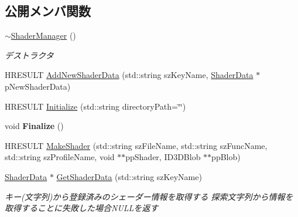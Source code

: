 \subsection*{公開メンバ関数}
\begin{DoxyCompactItemize}
\item 
\hyperlink{class_d3_d11_1_1_graphic_1_1_shader_manager_ade88b9cd89dfb4eb95b0cb874bf7168b}{$\sim$\+Shader\+Manager} ()\hypertarget{class_d3_d11_1_1_graphic_1_1_shader_manager_ade88b9cd89dfb4eb95b0cb874bf7168b}{}\label{class_d3_d11_1_1_graphic_1_1_shader_manager_ade88b9cd89dfb4eb95b0cb874bf7168b}

\begin{DoxyCompactList}\small\item\em デストラクタ \end{DoxyCompactList}\item 
H\+R\+E\+S\+U\+LT \hyperlink{class_d3_d11_1_1_graphic_1_1_shader_manager_ab30239875f87b8ad6c72cbc7eec479d4}{Add\+New\+Shader\+Data} (std\+::string sz\+Key\+Name, \hyperlink{struct_d3_d11_1_1_graphic_1_1_shader_data}{Shader\+Data} $\ast$p\+New\+Shader\+Data)
\item 
H\+R\+E\+S\+U\+LT \hyperlink{class_d3_d11_1_1_graphic_1_1_shader_manager_a206789dcc6ac911b3169d0dd706bfee6}{Initialize} (std\+::string directory\+Path=\char`\"{}\char`\"{})
\item 
void {\bfseries Finalize} ()\hypertarget{class_d3_d11_1_1_graphic_1_1_shader_manager_a8fee61d7a783cade1a3d07fe86284d27}{}\label{class_d3_d11_1_1_graphic_1_1_shader_manager_a8fee61d7a783cade1a3d07fe86284d27}

\item 
H\+R\+E\+S\+U\+LT \hyperlink{class_d3_d11_1_1_graphic_1_1_shader_manager_a5b52aad68e2e1517b8d6e74905d5d2f2}{Make\+Shader} (std\+::string sz\+File\+Name, std\+::string sz\+Func\+Name, std\+::string sz\+Profile\+Name, void $\ast$$\ast$pp\+Shader, I\+D3\+D\+Blob $\ast$$\ast$pp\+Blob)
\item 
\hyperlink{struct_d3_d11_1_1_graphic_1_1_shader_data}{Shader\+Data} $\ast$ \hyperlink{class_d3_d11_1_1_graphic_1_1_shader_manager_af58328bedb1bcde75d4beed5cdb431c1}{Get\+Shader\+Data} (std\+::string sz\+Key\+Name)\hypertarget{class_d3_d11_1_1_graphic_1_1_shader_manager_af58328bedb1bcde75d4beed5cdb431c1}{}\label{class_d3_d11_1_1_graphic_1_1_shader_manager_af58328bedb1bcde75d4beed5cdb431c1}

\begin{DoxyCompactList}\small\item\em キー(文字列)から登録済みのシェーダー情報を取得する  探索文字列から情報を取得することに失敗した場合\+N\+U\+L\+Lを返す \end{DoxyCompactList}\end{DoxyCompactItemize}
